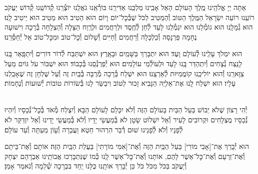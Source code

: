 \documentclass[twoside, openany, parskip=half, 11pt]{book}
\begin{document}
אַתָּה יְיָ אֱלֹהֵֽינוּ מֶֽלֶךְ הָעוֹלָם הָאֵל אָבִֽינוּ מַלְכֵּֽנוּ אַדִּירֵֽנוּ בּוֹרְ֯אֵֽנוּ גֹאֲלֵֽנוּ יוֹצְ֯רֵֽנוּ קְ֯דוֹשֵֽׁנוּ קְ֯דוֹשׁ יַעֲקֹב רוֹעֵֽנוּ רוֹעֵה יִשְׂרָאֵל הַמֶּֽלֶךְ הַטּוֹב וְ֯הַמֵּטִיב לַכֹּל שֶׁבְּ֯כׇל־יוֹם וָיוֹם הוּא הֵטִיב הוּא מֵטִיב הוּא יֵיטִיב לָֽנוּ׃ הוּא גְ֯מָלָֽנוּ הוּא גוֹמְ֯לֵנוּ הוּא יִגְמְ֯לֵנוּ לָעַד לְ֯חֵן לְ֯חֶֽסֶד וּלְרַחֲמִים וּלְרֶֽוַח הַצָּלָה וְ֯הַצְלָחָה בְּ֯רָכָה וִישׁוּעָה נֶחָמָה פַּרְנָסָה וְ֯כַלְכָּלָה וְ֯רַחֲמִים וְ֯חַיִּים וְ֯שָׁלוֹם וְ֯כׇל־טוֹב וּמִכׇּל־טוֹב אַל יְ֯חַסְּ֯רֵֽנוּ׃

הוּא יִמְלֹךְ עָלֵֽינוּ לְ֯עוֹלָם וָעֶד׃
הוּא יִתְבָּרַךְ בַּשָּׁמַֽיִם וּבָאָֽרֶץ׃
הוּא יִשְׁתַּבַּח לְ֯דוֹר דּוֹרִים וְ֯יִתְפָּֽאַר בָּֽנוּ לָנֵֽצַח נְ֯צָחִים
וְ֯יִתְהַדַּר בָּֽנוּ לָעַד וּלְעוֹלְ֯מֵי עוֹלָמִים׃
הוּא יְ֯פַרְנְ֯סֵֽנוּ בְּ֯כָבוֹד׃
הוּא יִשְׁבּוֹר עֹל גּוֹיִם מֵעַל צַוָּארֵֽנוּ וְ֯הוּא יוֹלִיכֵֽנוּ קוֹמֲמִיּוּת לְ֯אַרְצֵֽנוּ׃
הוּא יִשְׁלַח בְּ֯רָכָה מְ֯רֻבָּה בְּ֯בַֽיִת זֶה וְ֯עַל שֻׁלְחָן זֶה שֶׁאָכַֽלְנוּ עָלָיו׃
הוּא יִשְׁלַח לָֽנוּ אֶת־אֵלִיָּֽה הַנָּבִיא זָכוּר לַטּוֹב וִיבַשֵּׂר לָנוּ בְּ֯שׂוֹרוֹת טוֹבוֹת יְ֯שׁוּעוֹת וְ֯נֶחָמוֹת׃


\begin{footnotesize}
\\
יְ֯הִי רָצוֹן שֶׁלֹא יֵבוֹשׁ בַּעַל הַבַּיִת בָּעוֹלָם הַזֶּה וְ֯לֹא יִכָּלֵם לָעוֹלָם הַבָּא וְ֯יִצְלַח מְ֯אֹד בְּ֯כׇל־נְ֯כָסָיו וְ֯יִהְיוּ נְ֯כָסָיו מֻצְלָחִים וּקְרוֹבִים לָעִיר וְ֯אַל יִשְׁלוֹט שָׂטָן לֹא בְּ֯מַעֲשֵׂי יָדָיו וְ֯לֹא בְּ֯מַעֲשֵׂי יָדֵינוּ וְ֯אַל יִזְדַקֵּר לֹא לְ֯פָנָיו וְ֯לֹא לְ֯פָנֵינוּ שׁוּם דְ֯בַר הִרְהוּר חֵטְא וַעֲבֵרָה וְ֯עָוֹן מֵעַתָּה וְ֯עַד עוֹלָם׃

\end{footnotesize}

הוּא יְ֯בָרֵךְ אֶת־[אָבִי מוֹרִי] בַּעַל הַבַּֽיִת הַזֶּה וְ֯אֶת־[אִמִּי מוֹרָתִי] בַּעֲלַת הַבַּֽיִת הַזֶּה׃ אוֹתָם וְ֯אֶת־בֵּיתָם וְ֯אֶת־זַרְעָם וְ֯אֶת־כׇּל־אַשֶׁר לָהֶם, אוֹתָנוּ וְ֯אֶת־כׇּל־אַשֶׁר לָֽנוּ כְּ֯מוֹ שֶׁנִּתְבָּרְכוּ אֲבוֹתֵֽינוּ אַבְרָהָם יִצְחָק וְ֯יַעֲקֹב בַּכֹּל מִכֹּל כֹּל כֵּן יְ֯בָרֵךְ אוֹתָֽנוּ כֻּלָּנוּ יַֽחַד בִּבְרָכָה שְׁ֯לֵמָה וְ֯נֹאמַר אָמֵן׃
\end{document}
